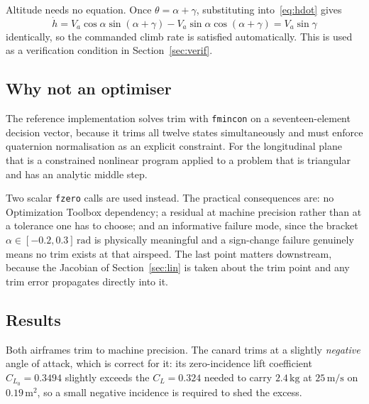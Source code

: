 \documentclass[11pt,a4paper]{article}
\begin{document}
Altitude needs no equation. Once $\theta = \alpha+\gamma$, substituting
into~\eqref{eq:hdot} gives
\begin{equation}
  \dot h = V_a\cos\alpha\sin(\alpha+\gamma) - V_a\sin\alpha\cos(\alpha+\gamma)
         = V_a\sin\gamma
  \label{eq:hdotauto}
\end{equation}
identically, so the commanded climb rate is satisfied automatically. This is used
as a verification condition in Section~\ref{sec:verif}.

\subsection{Why not an optimiser}

The reference implementation solves trim with \texttt{fmincon} on a seventeen-element
decision vector, because it trims all twelve states simultaneously and must
enforce quaternion normalisation as an explicit constraint. For the longitudinal
plane that is a constrained nonlinear program applied to a problem that is
triangular and has an analytic middle step.

Two scalar \texttt{fzero} calls are used instead. The practical consequences are:
no Optimization Toolbox dependency; a residual at machine precision rather than at
a tolerance one has to choose; and an informative failure mode, since the bracket
$\alpha\in[-0.2,0.3]\,\mathrm{rad}$ is physically meaningful and a sign-change
failure genuinely means no trim exists at that airspeed. The last point matters
downstream, because the Jacobian of Section~\ref{sec:lin} is taken about the trim
point and any trim error propagates directly into it.

\subsection{Results}

\begin{table}[htbp]
\centering

\caption{Trim at $V_a^*=25\,\mathrm{m/s}$, $\gamma^*=0$. The residual is
$\lVert f(x^*,u^*)\rVert$ over the first four states, i.e.\ how nearly the
computed point is a true equilibrium.}
\label{tab:trim}
\end{table}

Both airframes trim to machine precision. The canard trims at a slightly
\emph{negative} angle of attack, which is correct for it: its zero-incidence lift
coefficient $C_{L_0}=0.3494$ slightly exceeds the $C_L=0.324$ needed to carry
$2.4\,\mathrm{kg}$ at $25\,\mathrm{m/s}$ on $0.19\,\mathrm{m^2}$, so a small
negative incidence is required to shed the excess.
\end{document}
